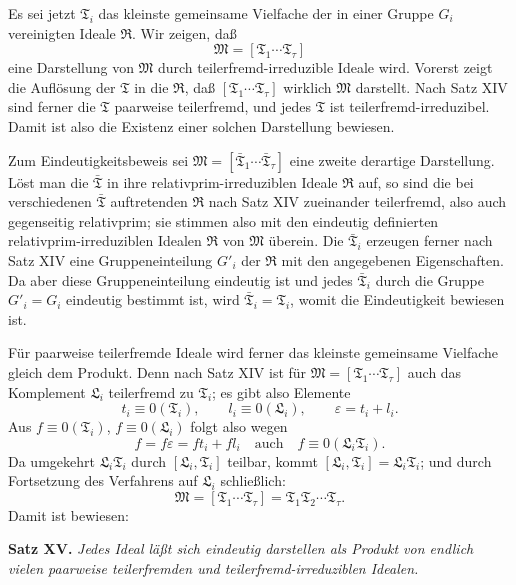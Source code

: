 \documentclass[11pt]{article}
\newcommand{\ideal}[1]{\mathfrak{#1}}
\begin{document}
Es sei jetzt $\ideal T_i$ das kleinste gemeinsame Vielfache der in einer Gruppe $G_i$ vereinigten Ideale $\ideal R$. Wir zeigen, daß
\[
 \ideal M=[\ideal T_1\cdots\ideal T_\tau]
\]
eine Darstellung von $\ideal M$ durch teilerfremd-irreduzible Ideale wird. Vorerst zeigt die Auflösung der $\ideal T$ in die $\ideal R$, daß $[\ideal T_1\cdots\ideal T_\tau]$ wirklich $\ideal M$ darstellt. Nach Satz XIV sind ferner die $\ideal T$ paarweise teilerfremd, und jedes $\ideal T$ ist teilerfremd-irreduzibel. Damit ist also die Existenz einer solchen Darstellung bewiesen.

Zum Eindeutigkeitsbeweis sei $\ideal M=[\bar{\ideal T}_1\cdots\bar{\ideal T}_\tau]$ eine zweite derartige Darstellung. Löst man die $\bar{\ideal T}$ in ihre relativprim-irreduziblen Ideale $\ideal R$ auf, so sind die bei verschiedenen $\bar{\ideal T}$ auftretenden $\ideal R$ nach Satz XIV zueinander teilerfremd, also auch gegenseitig relativprim; sie stimmen also mit den eindeutig definierten relativprim-irreduziblen Idealen $\ideal R$ von $\ideal M$ überein. Die $\bar{\ideal T}_i$ erzeugen ferner nach Satz XIV eine Gruppeneinteilung $G'_i$ der $\ideal R$ mit den angegebenen Eigenschaften. Da aber diese Gruppeneinteilung eindeutig ist und jedes $\bar{\ideal T}_i$ durch die Gruppe $G'_i=G_i$ eindeutig bestimmt ist, wird $\bar{\ideal T}_i=\ideal T_i$, womit die Eindeutigkeit bewiesen ist.

Für paarweise teilerfremde Ideale wird ferner das kleinste gemeinsame Vielfache gleich dem Produkt. Denn nach Satz XIV ist für $\ideal M=[\ideal T_1\cdots\ideal T_\tau]$ auch das Komplement $\ideal L_i$ teilerfremd zu $\ideal T_i$; es gibt also Elemente
\[
 t_i\equiv0(\ideal T_i),
 \qquad
 l_i\equiv0(\ideal L_i),
 \qquad
 \varepsilon=t_i+l_i.
\]
Aus $f\equiv0(\ideal T_i)$, $f\equiv0(\ideal L_i)$ folgt also wegen
\[
 f=f\varepsilon=ft_i+fl_i
 \quad\text{auch}\quad
 f\equiv0(\ideal L_i\ideal T_i).
\]
Da umgekehrt $\ideal L_i\ideal T_i$ durch $[\ideal L_i,\ideal T_i]$ teilbar, kommt $[\ideal L_i,\ideal T_i]=\ideal L_i\ideal T_i$; und durch Fortsetzung des Verfahrens auf $\ideal L_i$ schließlich:
\[
 \ideal M=[\ideal T_1\cdots\ideal T_\tau]
       =\ideal T_1\ideal T_2\cdots\ideal T_\tau.
\]
Damit ist bewiesen:

\textbf{Satz XV.} \emph{Jedes Ideal läßt sich eindeutig darstellen als Produkt von endlich vielen paarweise teilerfremden und teilerfremd-irreduziblen Idealen.}


\providecommand{\eqzero}[1]{\equiv 0\,(#1)}
\providecommand{\ideal}[1]{\mathfrak{#1}}
\setcounter{footnote}{34}
\end{document}
